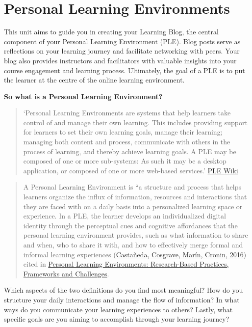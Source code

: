 \documentclass[
]{book}
\theoremstyle{definition}
\theoremstyle{definition}
\theoremstyle{definition}
\theoremstyle{definition}
\theoremstyle{remark}
\begin{document}
\hypertarget{personal-learning-environments}{%
\section{Personal Learning Environments}\label{personal-learning-environments}}

This unit aims to guide you in creating your Learning Blog, the central component of your Personal Learning Environment (PLE). Blog posts serve as reflections on your learning journey and facilitate networking with peers. Your blog also provides instructors and facilitators with valuable insights into your course engagement and learning process. Ultimately, the goal of a PLE is to put the learner at the centre of the online learning environment.

\textbf{So what is a Personal Learning Environment?}

\begin{quote}
`Personal Learning Environments are systems that help learners take control of and manage their own learning. This includes providing support for learners to set their own learning goals, manage their learning; managing both content and process, communicate with others in the process of learning, and thereby achieve learning goals. A PLE may be composed of one or more sub-systems: As such it may be a desktop application, or composed of one or more web-based services.' \href{https://edutechwiki.unige.ch/en/Personal_learning_environment}{PLE Wiki}
\end{quote}

\begin{quote}
A Personal Learning Environment is ``a structure and process that helps learners organize the influx of information, resources and interactions that they are faced with on a daily basis into a personalized learning space or experience. In a PLE, the learner develops an individualized digital identity through the perceptual cues and cognitive affordances that the personal learning environment provides, such as what information to share and when, who to share it with, and how to effectively merge formal and informal learning experiences (\href{https://naerjournal.ua.es/article/view/v6n1-introduction\#}{Castañeda, Cosgrave, Marín, Cronin, 2016}) cited in \href{https://naerjournal.ua.es/article/view/v6n1-introduction}{Personal Learning Environments: Research-Based Practices, Frameworks and Challenges}.
\end{quote}

Which aspects of the two definitions do you find most meaningful? How do you structure your daily interactions and manage the flow of information? In what ways do you communicate your learning experiences to others? Lastly, what specific goals are you aiming to accomplish through your learning journey?
\end{document}
